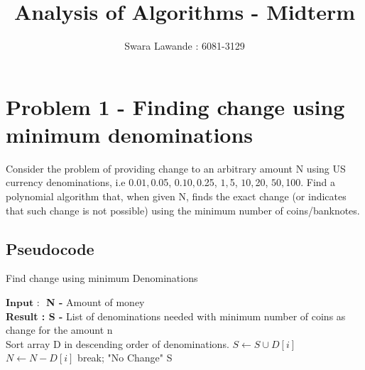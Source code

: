 \documentclass[12pt]{article}
\title{Analysis of Algorithms - Midterm}
\author{Swara Lawande : 6081-3129}
\begin{document}
\maketitle
\thispagestyle{empty}
\tableofcontents
\break
\clearpage
{} 
\section{Problem 1 - Finding change using minimum denominations}
Consider the problem of providing change to an arbitrary amount N using US currency denominations, i.e $0.01, $0.05, $0.10, $0.25, $1, $5, $10, $20, $50, $100. Find a polynomial algorithm that, when given N, finds the exact change (or indicates that such change is not possible) using the minimum number of coins/banknotes.
\subsection{Pseudocode}

   \begin{algorithm}[H]
    \caption{Find change using minimum Denominations}\label{alg:mst}
    \begin{algorithmic}
    \State $\textbf{Input : } $
        \State \textbf{N - } Amount of money\\
    \State \textbf{Result : S -} List of denominations needed with minimum number of coins as change for the amount n\\
    \State Sort array D in descending order of denominations.
            \State $S \gets S \cup D[i]$
            \State $N \gets N - D[i]$ 
            \State break;
        \EndIf
        \EndWhile
    \EndFor
        \State \Return "No Change"
    \EndIf
    \State \Return S
    \end{algorithmic}
    \end{algorithm}
\end{document}
